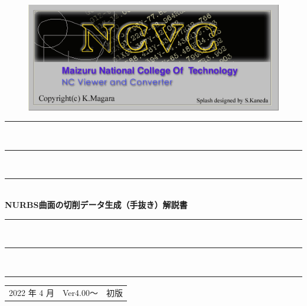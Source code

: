 
\vspace*{4zh}
\begin{figure}[H]
\centering
\includegraphics[scale=1.2]{logo.png}
\end{figure}

\vspace*{3zh}
\begin{center}
    \rule{12cm}{0.2zw}\\[-0.5zh]
    \rule{11cm}{0.1zw}\\[-0.5zh]
    \rule{10cm}{0.05zw}\\[1zh]
    {\Large \textbf{NURBS曲面の切削データ生成}}\textbf{（手抜き）}{\Large \textbf{解説書}}\\
    \rule{10cm}{0.05zw}\\[-0.5zh]
    \rule{11cm}{0.1zw}\\[-0.5zh]
    \rule{12cm}{0.2zw}

    \vspace*{7cm}
    \begin{table}[H]
        \centering
        \begin{tabular}{ccc}
            2022 年 4 月 & Ver4.00～ & 初版\\
        \end{tabular}
    \end{table}
\end{center}
